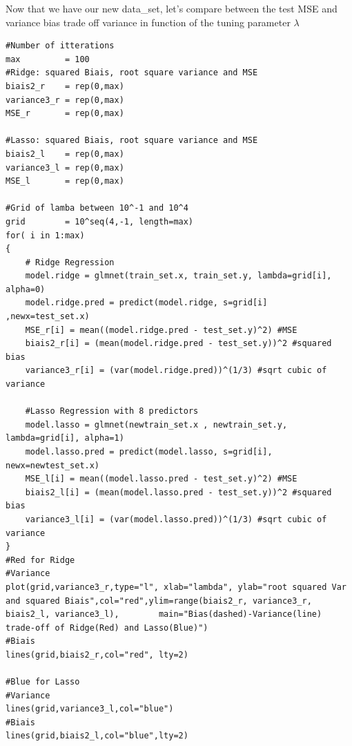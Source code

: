 \documentclass[]{report}
\begin{document}
Now that we have our new data\_set, let's compare between the test MSE and variance bias trade off variance in function of the tuning parameter $\lambda$
\begin{lstlisting}
#Number of itterations
max         = 100
#Ridge: squared Biais, root square variance and MSE
biais2_r    = rep(0,max)
variance3_r = rep(0,max) 
MSE_r       = rep(0,max)

#Lasso: squared Biais, root square variance and MSE
biais2_l    = rep(0,max)
variance3_l = rep(0,max) 
MSE_l       = rep(0,max)

#Grid of lamba between 10^-1 and 10^4
grid        = 10^seq(4,-1, length=max)
for( i in 1:max)
{    
	# Ridge Regression
	model.ridge = glmnet(train_set.x, train_set.y, lambda=grid[i], alpha=0)
	model.ridge.pred = predict(model.ridge, s=grid[i] ,newx=test_set.x)    
	MSE_r[i] = mean((model.ridge.pred - test_set.y)^2) #MSE
	biais2_r[i] = (mean(model.ridge.pred - test_set.y))^2 #squared bias
	variance3_r[i] = (var(model.ridge.pred))^(1/3) #sqrt cubic of variance

	#Lasso Regression with 8 predictors
	model.lasso = glmnet(newtrain_set.x , newtrain_set.y, lambda=grid[i], alpha=1)
	model.lasso.pred = predict(model.lasso, s=grid[i], newx=newtest_set.x) 
	MSE_l[i] = mean((model.lasso.pred - test_set.y)^2) #MSE
	biais2_l[i] = (mean(model.lasso.pred - test_set.y))^2 #squared bias
	variance3_l[i] = (var(model.lasso.pred))^(1/3) #sqrt cubic of variance   
}
#Red for Ridge
#Variance
plot(grid,variance3_r,type="l", xlab="lambda", ylab="root squared Var and squared Biais",col="red",ylim=range(biais2_r, variance3_r, biais2_l, variance3_l), 		main="Bias(dashed)-Variance(line) trade-off of Ridge(Red) and Lasso(Blue)") 
#Biais
lines(grid,biais2_r,col="red", lty=2)
 
#Blue for Lasso
#Variance
lines(grid,variance3_l,col="blue")
#Biais 
lines(grid,biais2_l,col="blue",lty=2) 
\end{lstlisting}
\end{document}
